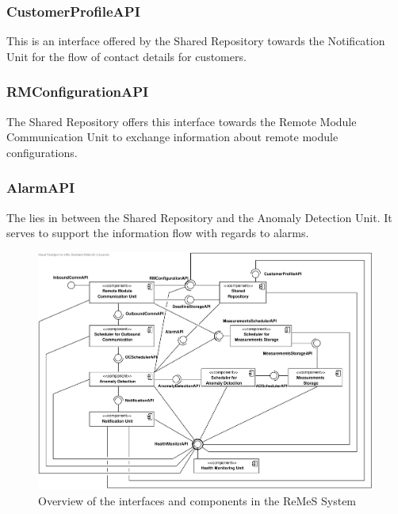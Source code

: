 \subsubsection{CustomerProfileAPI}

\npar This is an interface offered by the Shared Repository towards the
Notification Unit for the flow of contact details for customers.

\subsubsection{RMConfigurationAPI}

\npar The Shared Repository offers this interface towards the Remote Module
Communication Unit to exchange information about remote module configurations.

\subsubsection{AlarmAPI}

\npar The  lies in between the Shared Repository and the
Anomaly Detection Unit. It serves to support the information flow with regards
to alarms.

\begin{figure}[H]
	\begin{centering}
		\includegraphics[height=\textwidth,angle=90]{figs/add-it1-interfaces.pdf}
		\caption{Overview of the interfaces and components in the ReMeS
		System}
		\label{fig:it1/interfaces}
	\end{centering}
\end{figure}

